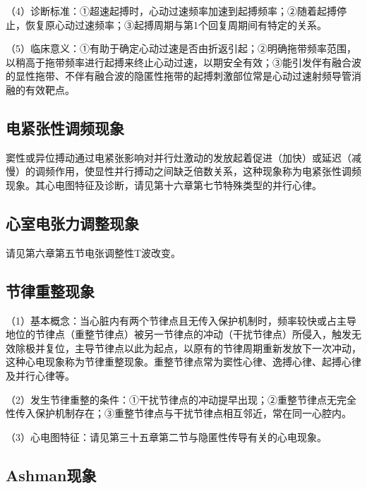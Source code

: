 （4）诊断标准：①超速起搏时，心动过速频率加速到起搏频率；②随着起搏停止，恢复原心动过速频率；③起搏周期与第1个回复周期间有特定的关系。

（5）临床意义：①有助于确定心动过速是否由折返引起；②明确拖带频率范围，以稍高于拖带频率进行起搏来终止心动过速，以期安全有效；③能引发伴有融合波的显性拖带、不伴有融合波的隐匿性拖带的起搏刺激部位常是心动过速射频导管消融的有效靶点。

\protect\hypertarget{text00047.htmlux5cux23subid531}{}{}

\subsection{电紧张性调频现象}

窦性或异位搏动通过电紧张影响对并行灶激动的发放起着促进（加快）或延迟（减慢）的调频作用，使显性并行搏动之间缺乏倍数关系，这种现象称为电紧张性调频现象。其心电图特征及诊断，请见第十六章第七节特殊类型的并行心律。

\protect\hypertarget{text00047.htmlux5cux23subid532}{}{}

\subsection{心室电张力调整现象}

请见第六章第五节电张调整性T波改变。

\protect\hypertarget{text00047.htmlux5cux23subid533}{}{}

\subsection{节律重整现象}

（1）基本概念：当心脏内有两个节律点且无传入保护机制时，频率较快或占主导地位的节律点（重整节律点）被另一节律点的冲动（干扰节律点）所侵入，触发无效除极并复位，主导节律点以此为起点，以原有的节律周期重新发放下一次冲动，这种心电现象称为节律重整现象。重整节律点常为窦性心律、逸搏心律、起搏心律及并行心律等。

（2）发生节律重整的条件：①干扰节律点的冲动提早出现；②重整节律点无完全性传入保护机制存在；③重整节律点与干扰节律点相互邻近，常在同一心腔内。

（3）心电图特征：请见第三十五章第二节与隐匿性传导有关的心电现象。

\protect\hypertarget{text00047.htmlux5cux23subid534}{}{}

\subsection{Ashman现象}

